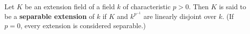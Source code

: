 Let $K$ be an extension field of a field $k$ of characteristic $p > 0$. Then $K$ is said to be a \textbf{separable extension} of $k$ if $K$ and $k^{p^{-1}}$ are linearly disjoint over $k$. (If $p = 0$, every extension is considered separable.)
